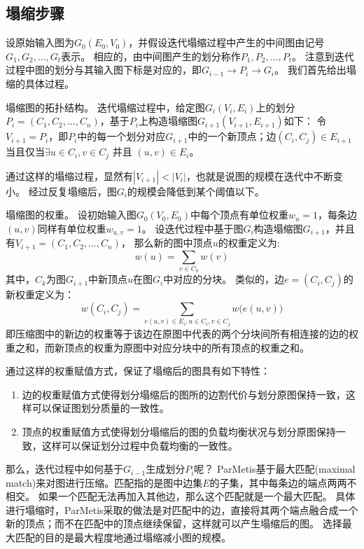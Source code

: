 \documentclass[master]{njuthesis}
\begin{document}
\subsection{塌缩步骤}
设原始输入图为$G_{0}(E_0,V_0)$，并假设迭代塌缩过程中产生的中间图由记号$G_1, G_2, \dots, G_t$表示。
相应的，由中间图产生的划分称作$P_1, P_2, \dots, P_{t}$。
注意到迭代过程中图的划分与其输入图下标是对应的，即$G_{i-1} \rightarrow P_i \rightarrow G_i$。
我们首先给出塌缩的具体过程。
\begin{definition}
塌缩图的拓扑结构。 迭代塌缩过程中，给定图$G_i(V_i, E_i)$上的划分$P_i=(C_1, C_2, \dots, C_n)$，基于$P_i$上构造塌缩图$G_{i+1}(V_{i+1}, E_{i+1})$如下：
 令$V_{i+1} = P_i$，即$P_i$中的每一个划分对应$G_{i+1}$中的一个新顶点；边$(C_i, C_j) \in E_{i+1}$当且仅当$\exists
 u \in C_i, v \in C_j$ 并且 $(u, v) \in E_i$。
\end{definition}
通过这样的塌缩过程，显然有$|V_{i+1}| < |V_i|$，也就是说图的规模在迭代中不断变小。
经过反复塌缩后，图$G_i$的规模会降低到某个阈值以下。
\begin{definition}
塌缩图的权重。 设初始输入图$G_{0}(V_0,E_0)$中每个顶点有单位权重$w_u=1$，每条边$(u,v)$同样有单位权重$w_{u,v}=1$。
设迭代过程中基于图$G_i$构造塌缩图$G_{i+1}$，并且有$V_{i+1}=(C_1, C_2, \dots, C_n)$，
那么新的图中顶点$u$的权重定义为:
\begin{equation}
\label{eq:vertex_weight}
w(u) = \sum\limits_{v \in C_k} w(v)
\end{equation}
其中，$C_k$为图$G_{i+1}$中新顶点$u$在图$G_i$中对应的分块。
类似的，边$e=(C_i, C_j)$的新权重定义为：
 \begin{equation}
w(C_i, C_j) = \sum\limits_{e(u,v) \in E_i, u \in C_i, v \in C_j} w\big(e(u,v)\big)
\end{equation}
即压缩图中的新边的权重等于该边在原图中代表的两个分块间所有相连接的边的权重之和，而新顶点的权重为原图中对应分块中的所有顶点的权重之和。
\end{definition}
通过这样的权重赋值方式，保证了塌缩后的图具有如下特性：
\begin{enumerate}
 \item 边的权重赋值方式使得划分塌缩后的图所的边割代价与划分原图保持一致，这样可以保证图划分质量的一致性。
 \item 顶点的权重赋值方式使得划分塌缩后的图的负载均衡状况与划分原图保持一致，这样可以保证划分过程中负载均衡的一致性。
\end{enumerate}

那么，迭代过程中如何基于$G_{i-1}$生成划分$P_i$呢？
ParMetis\cite{karypis1998parallel}基于最大匹配(maximal match)来对图进行压缩。匹配指的是图中边集$E$的子集，其中每条边的端点两两不相交。
如果一个匹配无法再加入其他边，那么这个匹配就是一个最大匹配。
具体进行塌缩时，ParMetis采取的做法是对匹配中的边，直接将其两个端点融合成一个新的顶点；而不在匹配中的顶点继续保留，这样就可以产生塌缩后的图。
选择最大匹配的目的是最大程度地通过塌缩减小图的规模。
\end{document}
